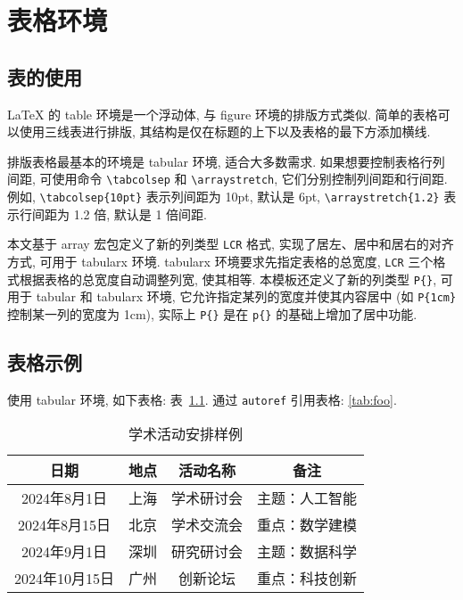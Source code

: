 

\chapter{表格环境}

\section{表的使用}

LaTeX 的 table 环境是一个浮动体, 与 figure 环境的排版方式类似. 简单的表格可以使用三线表进行排版, 其结构是仅在标题的上下以及表格的最下方添加横线.

排版表格最基本的环境是 tabular 环境, 适合大多数需求. 如果想要控制表格行列间距, 可使用命令 \verb|\tabcolsep| 和 \verb|\arraystretch|, 它们分别控制列间距和行间距. 例如, \verb|\tabcolsep{10pt}| 表示列间距为 10pt, 默认是 6pt,  \verb|\arraystretch{1.2}| 表示行间距为 1.2 倍, 默认是 1 倍间距.

本文基于 array 宏包定义了新的列类型 \verb|LCR| 格式, 实现了居左、居中和居右的对齐方式, 可用于 tabularx 环境. tabularx 环境要求先指定表格的总宽度, \verb|LCR| 三个格式根据表格的总宽度自动调整列宽, 使其相等. 本模板还定义了新的列类型 \verb|P{}|, 可用于 tabular 和 tabularx 环境, 它允许指定某列的宽度并使其内容居中 (如 \verb|P{1cm}| 控制某一列的宽度为 1cm), 实际上 \verb|P{}| 是在 \verb|p{}| 的基础上增加了居中功能.


\section{表格示例}

使用 tabular 环境, 如下表格: 表~\ref{tab:foo}. 通过 \verb|autoref| 引用表格: \autoref{tab:foo}.

\begin{table}[htp!]
\centering
\setlength{\tabcolsep}{12pt}  %
\renewcommand{\arraystretch}{1.2}
\caption{学术活动安排样例}
\label{tab:foo}
\begin{tabular}{|c|c|c|c|}
\hline
\textbf{日期}  & \textbf{地点} & \textbf{活动名称} & \textbf{备注} \\ \hline
2024年8月1日      & 上海       & 学术研讨会      & 主题：人工智能 \\ \hline
2024年8月15日    & 北京       & 学术交流会      & 重点：数学建模 \\ \hline
2024年9月1日      & 深圳       & 研究研讨会      & 主题：数据科学 \\ \hline
2024年10月15日  & 广州       & 创新论坛         & 重点：科技创新 \\ \hline
\end{tabular}
\end{table}

